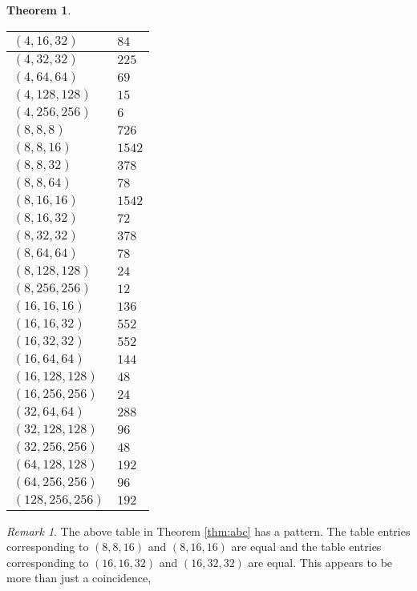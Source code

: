 \documentclass{dcthesis}
\numberwithin{equation}{section}
\newtheorem{theorem}[equation]{Theorem}
\theoremstyle{definition}
\theoremstyle{remark}
\newtheorem{remark}[equation]{Remark}
\begin{document}
{{{\begin{theorem}
\begin{longtable}{|l|l|}
        $(4,16,32)$ & $84$ \\ \hline
        $(4,32,32)$ & $225$ \\ \hline
        $(4,64,64)$ & $69$ \\ \hline
        $(4,128,128)$ & $15$ \\ \hline
        $(4,256,256)$ & $6$ \\ \hline
        $(8,8,8)$ & $726$ \\ \hline
        $(8,8,16)$ & $1542$ \\ \hline
        $(8,8,32)$ & $378$ \\ \hline
        $(8,8,64)$ & $78$ \\ \hline
        $(8,16,16)$ & $1542$ \\ \hline
        $(8,16,32)$ & $72$ \\ \hline
        $(8,32,32)$ & $378$ \\ \hline
        $(8,64,64)$ & $78$ \\ \hline
        $(8,128,128)$ & $24$ \\ \hline
        $(8,256,256)$ & $12$ \\ \hline
        $(16,16,16)$ & $136$ \\ \hline
        $(16,16,32)$ & $552$ \\ \hline
        $(16,32,32)$ & $552$ \\ \hline
        $(16,64,64)$ & $144$ \\ \hline
        $(16,128,128)$ & $48$ \\ \hline
        $(16,256,256)$ & $24$ \\ \hline
        $(32,64,64)$ & $288$ \\ \hline
        $(32,128,128)$ & $96$ \\ \hline
        $(32,256,256)$ & $48$ \\ \hline
        $(64,128,128)$ & $192$ \\ \hline
        $(64,256,256)$ & $96$ \\ \hline
        $(128,256,256)$ & $192$ \\ \hline
      \end{longtable}
    \end{theorem}
    \begin{remark}
      \label{rmk:extrasymmetry}
      The above table in Theorem \ref{thm:abc}
      has a pattern.
      The table entries corresponding to
      $(8,8,16)$ and $(8,16,16)$ are equal
      and the table entries corresponding to
      $(16,16,32)$ and $(16,32,32)$ are equal.
      This appears to be more than just a coincidence,

\end{remark}}}}
\end{document}
